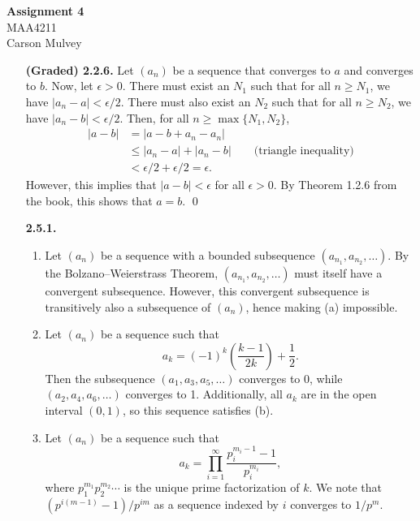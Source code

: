 \documentclass[11pt,letterpaper]{article}
\begin{document}
\begin{center}
    \begin{large}
        \textbf{Assignment 4} \\
        MAA4211 \\
        Carson Mulvey
    \end{large}
\end{center}

\begin{enumerate}
    \item[\textbf{(Graded) 2.2.6.}] Let $(a_n)$ be a sequence that converges to $a$ and converges to $b$. Now, let $\epsilon>0$. There must exist an $N_1$ such that for all $n\geq N_1$, we have $|a_n-a| < \epsilon/2$. There must also exist an $N_2$ such that for all $n \geq N_2$, we have $|a_n-b| < \epsilon/2$. Then, for all $n \geq \max\{N_1,N_2\}$,
    \begin{align*}
        |a-b| &= |a-b+a_n-a_n| \\
        &\leq |a_n-a| + |a_n-b| \qquad\text{(triangle inequality)}
        \\ 
        &< \epsilon/2 + \epsilon/2 = \epsilon.
    \end{align*}
    However, this implies that $|a-b|<\epsilon$ for all $\epsilon>0$. By Theorem 1.2.6 from the book, this shows that $a=b$. \qed

    \item[\textbf{2.5.1.}]
\begin{enumerate}
    \item Let $(a_n)$ be a sequence with a bounded subsequence $(a_{n_1},a_{n_2},\dots)$. By the Bolzano--Weierstrass Theorem, $(a_{n_1},a_{n_2},\dots)$ must itself have a convergent subsequence. However, this convergent subsequence is transitively also a subsequence of $(a_n)$, hence making (a) impossible.

    \item Let $(a_n)$ be a sequence such that
    \[
        a_k = (-1)^{k}\left(\frac{k-1}{2k}\right)+\frac{1}{2}.
    \]
    Then the subsequence $(a_1,a_3,a_5,\dots)$ converges to 0, while $(a_2,a_4,a_6,\dots)$ converges to 1. Additionally, all $a_k$ are in the open interval $(0,1)$, so this sequence satisfies (b).

    \item Let $(a_n)$ be a sequence such that 
    \[
        a_k = \prod_{i=1}^\infty \frac{p_{i}^{m_{i}-1}-1}{p_{i}^{m_{i}}},
    \]
    where $p_1^{m_1}p_2^{m_2}\cdots$ is the unique prime factorization of $k$. We note that $(p^{i(m-1)}-1)/{p^{im}}$ as a sequence indexed by $i$ converges to $1/p^m$.


\end{enumerate}
\end{enumerate}
\end{document}
